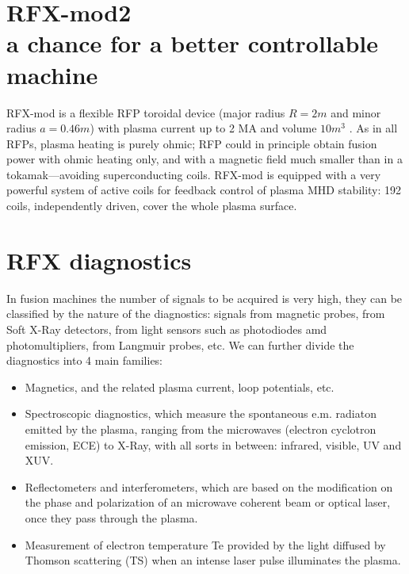 
\section{RFX-mod2 \\ \small{a chance for a better controllable machine}}
\cite{SONATO2003161}
\cite{doi:10.1063/1.4806765}
\cite{martin_RFX_overview}


RFX-mod is a flexible \ac{RFP} toroidal device (major radius $R=2 m$ and minor radius $a=0.46 m$) with plasma current up to 2 MA and volume $10 m^3$ \cite{SONATO200597}. As in all RFPs, plasma heating is purely ohmic; \acl{RFP} could in principle obtain fusion power with ohmic heating only, and with a magnetic field much smaller than in a tokamak—avoiding superconducting coils. RFX-mod is equipped with a very powerful system of active coils for feedback control of plasma MHD stability: 192 coils, independently driven, cover the whole plasma surface.


\section{RFX diagnostics}
In fusion machines the number of signals to be acquired is very high, they can be classified by the nature of the diagnostics:
signals from magnetic probes, from Soft X-Ray detectors, from light sensors such as photodiodes amd photomultipliers, from Langmuir probes, etc.
%
We can further divide the diagnostics into 4 main families:
\begin{itemize}
    \item Magnetics, and the related plasma current, loop potentials, etc.
    \item Spectroscopic diagnostics, which measure the spontaneous e.m. radiaton emitted by the plasma, ranging from the microwaves (electron cyclotron emission, ECE) to X-Ray, with all sorts in between: infrared, visible, UV and XUV. 
    \item Reflectometers and interferometers, which are based on the modification on the phase and polarization of an microwave coherent beam or optical laser, once they pass through the plasma.  
    \item Measurement of electron temperature Te provided by the light diffused by Thomson scattering (TS) when an intense laser pulse illuminates the plasma.
\end{itemize}

